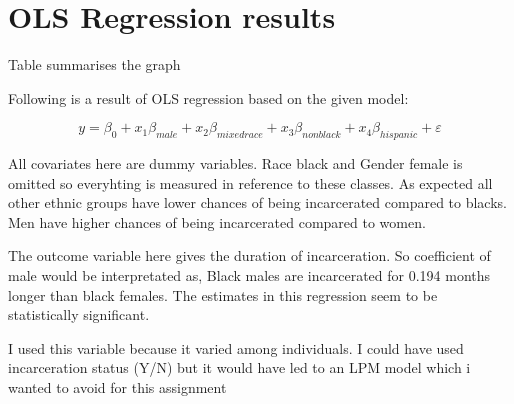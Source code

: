 \documentclass{article}
\begin{document}
\section{OLS Regression results}

Table summarises the graph



Following is a result of OLS regression based on the given model:

\begin{equation*}
    y = \beta_0 + x_1\beta_{male} + x_2\beta_{mixedrace} +x_3\beta_{nonblack} +x_4\beta_{hispanic} +\varepsilon
\end{equation*}

All covariates here are dummy variables. Race black and Gender female is omitted so everyhting is measured in reference to these classes. As expected all other ethnic groups have lower chances of being incarcerated compared to blacks. Men have higher chances of being incarcerated compared to women. 

The outcome variable here gives the duration of incarceration. So coefficient of male would be interpretated as, Black males are incarcerated for 0.194 months longer than black females. The estimates in this regression seem to be statistically significant.

I used this variable because it varied among individuals. I could have used incarceration status (Y/N) but it would have led to an LPM model which i wanted to avoid for this assignment


\end{document}
